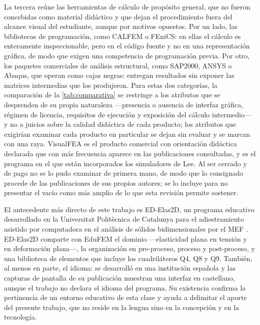 La tercera reúne las herramientas de cálculo de propósito general, que no fueron concebidas como material didáctico y que dejan el procedimiento fuera del alcance visual del estudiante, aunque por motivos opuestos. Por un lado, las bibliotecas de programación, como CALFEM o FEniCS: en ellas el cálculo es enteramente inspeccionable, pero en el código fuente y no en una representación gráfica, de modo que exigen una competencia de programación previa. Por otro, los paquetes comerciales de análisis estructural, como SAP2000, ANSYS o Abaqus, que operan como cajas negras: entregan resultados sin exponer las matrices intermedias que los produjeron. Para estas dos categorías, la comparación de la \autoref{tab:comparativa} se restringe a los atributos que se desprenden de su propia naturaleza —presencia o ausencia de interfaz gráfica, régimen de licencia, requisitos de ejecución y exposición del cálculo intermedio— y no a juicios sobre la calidad didáctica de cada producto; los atributos que exigirían examinar cada producto en particular se dejan sin evaluar y se marcan con una raya. VisualFEA es el producto comercial con orientación didáctica declarada que con más frecuencia aparece en las publicaciones consultadas, y es el programa en el que están incorporados los simuladores de Lee. Al ser cerrado y de pago no se lo pudo examinar de primera mano, de modo que lo consignado procede de las publicaciones de sus propios autores; se lo incluye para no presentar el vacío como más amplio de lo que esta revisión permite sostener.

El antecedente más directo de este trabajo es ED-Elas2D, un programa educativo desarrollado en la Universitat Politècnica de Catalunya para el adiestramiento asistido por computadora en el análisis de sólidos bidimensionales por el MEF \autocite{suarez1998edelas2d}. ED-Elas2D comparte con EduFEM el dominio —elasticidad plana en tensión y en deformación plana—, la organización en pre-proceso, proceso y post-proceso, y una biblioteca de elementos que incluye los cuadriláteros Q4, Q8 y Q9. También, al menos en parte, el idioma: se desarrolló en una institución española y las capturas de pantalla de su publicación muestran una interfaz en castellano, aunque el trabajo no declara el idioma del programa. Su existencia confirma la pertinencia de un entorno educativo de esta clase y ayuda a delimitar el aporte del presente trabajo, que no reside en la lengua sino en la concepción y en la tecnología.


